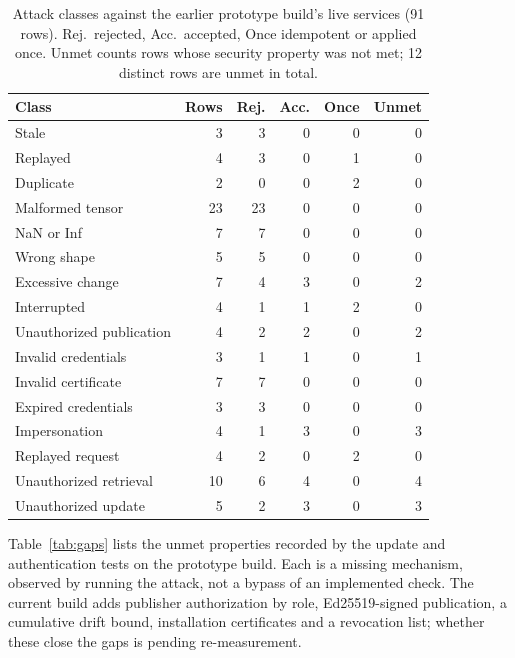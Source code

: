 \documentclass[sigconf]{acmart}
\theoremstyle{acmdefinition}\newtheorem{property}{Property}
\newcommand{\pendingStageThirteen}[1]{#1}
\begin{document}
\begin{table}[!t]
\centering
\caption{Attack classes against the earlier prototype build's live services (91 rows). Rej.\ rejected, Acc.\ accepted, Once idempotent or applied once. Unmet counts rows whose security property was not met; 12 distinct rows are unmet in total.}
\label{tab:updsec}
\small
\setlength{\tabcolsep}{3pt}
\begin{tabular}{lrrrrr}
\toprule
Class & Rows & Rej. & Acc. & Once & Unmet \\
\midrule
Stale & 3 & 3 & 0 & 0 & 0 \\
Replayed & 4 & 3 & 0 & 1 & 0 \\
Duplicate & 2 & 0 & 0 & 2 & 0 \\
Malformed tensor & 23 & 23 & 0 & 0 & 0 \\
NaN or Inf & 7 & 7 & 0 & 0 & 0 \\
Wrong shape & 5 & 5 & 0 & 0 & 0 \\
Excessive change & 7 & 4 & 3 & 0 & 2 \\
Interrupted & 4 & 1 & 1 & 2 & 0 \\
Unauthorized publication & 4 & 2 & 2 & 0 & 2 \\
\midrule
Invalid credentials & 3 & 1 & 1 & 0 & 1 \\
Invalid certificate & 7 & 7 & 0 & 0 & 0 \\
Expired credentials & 3 & 3 & 0 & 0 & 0 \\
Impersonation & 4 & 1 & 3 & 0 & 3 \\
Replayed request & 4 & 2 & 0 & 2 & 0 \\
Unauthorized retrieval & 10 & 6 & 4 & 0 & 4 \\
Unauthorized update & 5 & 2 & 3 & 0 & 3 \\
\bottomrule
\end{tabular}
\end{table}

Table~\ref{tab:gaps} lists the unmet properties recorded by the update and authentication tests on the prototype build. Each is a missing mechanism, observed by running the attack, not a bypass of an implemented check. The current build adds publisher authorization by role, Ed25519-signed publication, a cumulative drift bound, installation certificates and a revocation list; \pendingStageThirteen{whether these close the gaps is pending re-measurement}.
\end{document}
